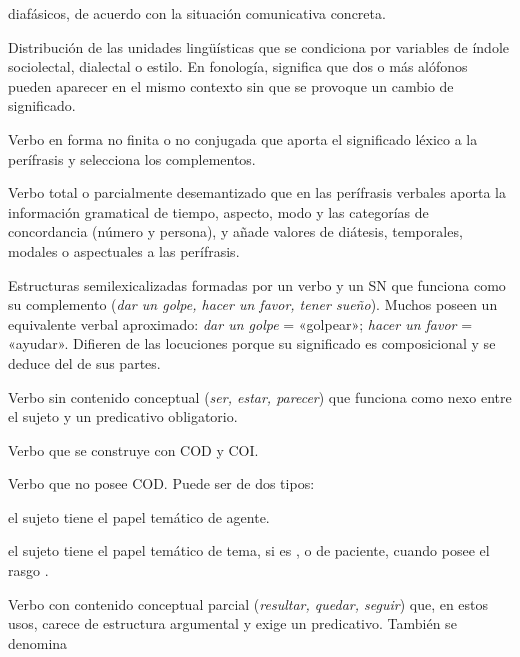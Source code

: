 \begin{glosariogeneral}
        diafásicos, de acuerdo con la situación comunicativa concreta.
  \item[Variación libre:] Distribución de las unidades lingüísticas que se
        condiciona por variables de índole sociolectal, dialectal o estilo. En
        fonología, significa que dos o más alófonos pueden aparecer en el mismo
        contexto sin que se provoque un cambio de significado.
  \item[Verbo auxiliado o principal:] Verbo en forma no finita o no conjugada
        que aporta el significado léxico a la perífrasis y selecciona los
        complementos.
  \item[Verbo auxiliar:] Verbo total o parcialmente desemantizado que en las
        perífrasis verbales aporta la información gramatical de tiempo,
        aspecto, modo y las categorías de concordancia (número y persona), y
        añade valores de diátesis, temporales, modales o aspectuales a las
        perífrasis.
  \item[Verbo de apoyo o soporte:] Estructuras semilexicalizadas formadas por un
        verbo y un SN que funciona como su complemento (\textit{dar un golpe,
        hacer un favor, tener sueño}). Muchos poseen un equivalente verbal
        aproximado: \textit{dar un golpe} = «golpear»; \textit{hacer un favor} =
        «ayudar». Difieren de las locuciones porque su significado es
        composicional y se deduce del de sus partes.
  \item[Verbo copulativo:] Verbo sin contenido conceptual (\textit{ser,
        estar, parecer}) que funciona como nexo entre el sujeto y un predicativo
        obligatorio.
  \item[Verbo ditransitivo:] Verbo que se construye con COD y COI.
  \item[Verbo intransitivo:] Verbo que no posee COD. Puede ser de dos tipos:
    \begin{glosario}
      \item[inergativo:] el sujeto tiene el papel temático de agente.
      \item[inacusativo:] el sujeto tiene el papel temático de tema, si es
            , o de paciente, cuando posee el rasgo
            .
    \end{glosario}
  \item[Verbo semicopulativo:] Verbo con contenido conceptual parcial
        (\textit{resultar, quedar, seguir}) que, en estos usos, carece de
        estructura argumental y exige un predicativo. También se denomina

\end{glosariogeneral}
